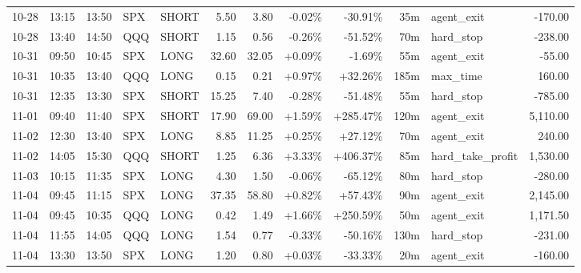 \documentclass[11pt,a4paper,twoside]{article}
\begin{document}
\begin{center}
\begin{longtable}{>{\color{txtmain}}l l l l l r r r r r >{\color{txtmain}}l r}
10-28 & 13:15 & 13:50 & SPX & SHORT & 5.50 & 3.80 & \textcolor{lossred}{-0.02\%} & \textcolor{lossred}{-30.91\%} & 35m & agent\_exit & \textcolor{lossred}{-170.00} \\
10-28 & 13:40 & 14:50 & QQQ & SHORT & 1.15 & 0.56 & \textcolor{lossred}{-0.26\%} & \textcolor{lossred}{-51.52\%} & 70m & hard\_stop & \textcolor{lossred}{-238.00} \\
10-31 & 09:50 & 10:45 & SPX & LONG & 32.60 & 32.05 & \textcolor{wingreen}{+0.09\%} & \textcolor{lossred}{-1.69\%} & 55m & agent\_exit & \textcolor{lossred}{-55.00} \\
10-31 & 10:35 & 13:40 & QQQ & LONG & 0.15 & 0.21 & \textcolor{wingreen}{+0.97\%} & \textcolor{wingreen}{+32.26\%} & 185m & max\_time & \textcolor{wingreen}{160.00} \\
10-31 & 12:35 & 13:30 & SPX & SHORT & 15.25 & 7.40 & \textcolor{lossred}{-0.28\%} & \textcolor{lossred}{-51.48\%} & 55m & hard\_stop & \textcolor{lossred}{-785.00} \\
11-01 & 09:40 & 11:40 & SPX & SHORT & 17.90 & 69.00 & \textcolor{wingreen}{+1.59\%} & \textcolor{wingreen}{+285.47\%} & 120m & agent\_exit & \textcolor{wingreen}{5,110.00} \\
11-02 & 12:30 & 13:40 & SPX & LONG & 8.85 & 11.25 & \textcolor{wingreen}{+0.25\%} & \textcolor{wingreen}{+27.12\%} & 70m & agent\_exit & \textcolor{wingreen}{240.00} \\
11-02 & 14:05 & 15:30 & QQQ & SHORT & 1.25 & 6.36 & \textcolor{wingreen}{+3.33\%} & \textcolor{wingreen}{+406.37\%} & 85m & hard\_take\_profit & \textcolor{wingreen}{1,530.00} \\
11-03 & 10:15 & 11:35 & SPX & LONG & 4.30 & 1.50 & \textcolor{lossred}{-0.06\%} & \textcolor{lossred}{-65.12\%} & 80m & hard\_stop & \textcolor{lossred}{-280.00} \\
11-04 & 09:45 & 11:15 & SPX & LONG & 37.35 & 58.80 & \textcolor{wingreen}{+0.82\%} & \textcolor{wingreen}{+57.43\%} & 90m & agent\_exit & \textcolor{wingreen}{2,145.00} \\
11-04 & 09:45 & 10:35 & QQQ & LONG & 0.42 & 1.49 & \textcolor{wingreen}{+1.66\%} & \textcolor{wingreen}{+250.59\%} & 50m & agent\_exit & \textcolor{wingreen}{1,171.50} \\
11-04 & 11:55 & 14:05 & QQQ & LONG & 1.54 & 0.77 & \textcolor{lossred}{-0.33\%} & \textcolor{lossred}{-50.16\%} & 130m & hard\_stop & \textcolor{lossred}{-231.00} \\
11-04 & 13:30 & 13:50 & SPX & LONG & 1.20 & 0.80 & \textcolor{wingreen}{+0.03\%} & \textcolor{lossred}{-33.33\%} & 20m & agent\_exit & \textcolor{lossred}{-160.00} \\

\end{longtable}
\end{center}
\end{document}

